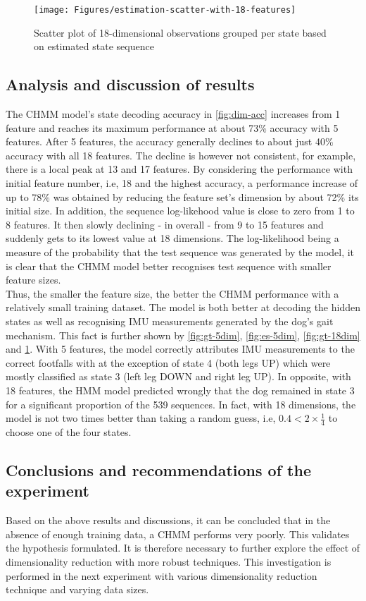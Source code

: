 \begin{figure}[ht!]
	\texttt{[image: Figures/estimation-scatter-with-18-features]}
	\caption{Scatter plot of 18-dimensional observations grouped per state based on estimated state sequence}
	\label{fig:es-18dim}
\end{figure}

\subsection{Analysis and discussion of results}

The CHMM model's state decoding accuracy in \ref{fig:dim-acc} increases from 1 feature and reaches its maximum performance at about 73\% accuracy with 5 features. After 5 features, the accuracy generally declines to about just 40\% accuracy with all 18 features. The decline is however not consistent, for example, there is a local peak at 13 and 17 features.
By considering the performance with initial feature number, i.e, 18 and the highest accuracy, a performance increase of up to 78\% was obtained by reducing the feature set's dimension by about 72\% its initial size.
In addition, the sequence log-likehood value is close to zero from 1 to 8 features. It then slowly declining - in overall - from 9 to 15 features and suddenly gets to its lowest value at 18 dimensions.
The log-likelihood being a measure of the probability that the test sequence was generated by the model, it is clear that the CHMM model better recognises test sequence with smaller feature sizes.\\
Thus, the smaller the feature size, the better the CHMM performance with a relatively small training dataset. The model is both better at decoding the hidden states as well as recognising IMU measurements generated by the dog's gait mechanism.
This fact is further shown by \ref{fig:gt-5dim}, \ref{fig:es-5dim}, \ref{fig:gt-18dim} and \ref{fig:es-18dim}. With 5 features, the model correctly attributes IMU measurements to the correct footfalls with at the exception of state 4 (both legs UP) which were mostly classified as state 3 (left leg DOWN and right leg UP). In opposite, with 18 features, the HMM model predicted wrongly that the dog remained in state 3 for a significant proportion of the 539 sequences. In fact, with 18 dimensions, the model is not two times better than taking a random guess, i.e, \(0.4 < 2\times\frac{1}{4}\) to choose one of the four states.

\subsection{Conclusions and recommendations of the experiment}
Based on the above results and discussions, it can be concluded that in the absence of enough training data, a CHMM performs very poorly. This validates the hypothesis formulated. It is therefore necessary to further explore the effect of dimensionality reduction with more robust techniques. This investigation is performed in the next experiment with various dimensionality reduction technique and varying data sizes.

